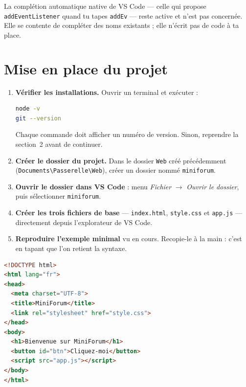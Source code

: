\documentclass[a4paper,11pt]{article}
\begin{document}
\begin{tcolorbox}[attention, title={Complétion et assistant, ce n'est pas la même chose}]
La complétion automatique native de VS Code --- celle qui propose \texttt{addEventListener} quand tu tapes \texttt{addEv} --- reste active et n'est pas concernée. Elle se contente de compléter des noms existants ; elle n'écrit pas de code à ta place.
\end{tcolorbox}

\section{Mise en place du projet}

\begin{enumerate}
  \item \textbf{Vérifier les installations.} Ouvrir un terminal et exécuter :
\begin{lstlisting}[language=bash, numbers=none]
node -v
git --version
\end{lstlisting}
  Chaque commande doit afficher un numéro de version. Sinon, reprendre la section~2 avant de continuer.

  \item \textbf{Créer le dossier du projet.} Dans le dossier \texttt{Web} créé précédemment (\texttt{Documents\textbackslash Passerelle\textbackslash Web}), créer un dossier nommé \texttt{miniforum}.

  \item \textbf{Ouvrir le dossier dans VS Code} : menu \textit{Fichier} $\rightarrow$ \textit{Ouvrir le dossier}, puis sélectionner \texttt{miniforum}.

  \item \textbf{Créer les trois fichiers de base} --- \texttt{index.html}, \texttt{style.css} et \texttt{app.js} --- directement depuis l'explorateur de VS Code.

  \item \textbf{Reproduire l'exemple minimal} vu en cours. Recopie-le à la main : c'est en tapant que l'on retient la syntaxe.
\end{enumerate}

\begin{lstlisting}[language=HTML, caption={\texttt{index.html}}]
<!DOCTYPE html>
<html lang="fr">
<head>
  <meta charset="UTF-8">
  <title>MiniForum</title>
  <link rel="stylesheet" href="style.css">
</head>
<body>
  <h1>Bienvenue sur MiniForum</h1>
  <button id="btn">Cliquez-moi</button>
  <script src="app.js"></script>
</body>
</html>
\end{lstlisting}
\end{document}
